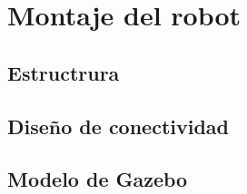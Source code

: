 \chapter{Montaje del robot}
\label{cap:montajedelrobot}

\section{Estructrura}
\label{cap:estructuradelrobot}

\section{Diseño de conectividad}
\label{cap:conectividad}

\section{Modelo de Gazebo}
\label{cap:modelodegazebo}

